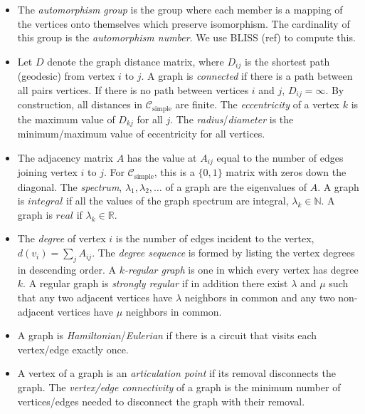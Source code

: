 \documentclass[12pt]{article}
\newcommand{\SIMPLECLASS}{\mathcal{C}_\text{simple}}
\begin{document}
\begin{itemize}

\item The \textit{automorphism group} is the group where each member is a mapping of the vertices onto themselves which preserve isomorphism. 
The cardinality of this group is the \textit{automorphism number}.
We use BLISS (ref) to compute this.

\item Let $D$ denote the graph distance matrix, where $D_{ij}$ is the shortest path (geodesic) from vertex $i$ to $j$.
A graph is \textit{connected} if there is a path between all pairs vertices.
If there is no path between vertices $i$ and $j$, $D_{ij}=\infty$.
By construction, all distances in $\SIMPLECLASS$ are finite.
The \textit{eccentricity} of a vertex $k$ is the maximum value of $D_{k j}$ for all $j$.
The \textit{radius}/\textit{diameter} is the minimum/maximum value of eccentricity for all vertices.

\item The adjacency matrix $A$ has the value at $A_{ij}$ equal to the number of edges joining vertex $i$ to $j$. 
For $\SIMPLECLASS$, this is a $\{0,1\}$ matrix with zeros down the diagonal. 
The \textit{spectrum}, $\lambda_1, \lambda_2, \ldots$ of a graph are the eigenvalues of $A$. 
A graph is $integral$ if all the values of the graph spectrum are integral, $\lambda_k \in \mathbb{N}$. 
A graph is $real$ if $\lambda_k \in \mathbb{R}$.

\item The \textit{degree} of vertex $i$ is the number of edges incident to the vertex, $d(v_i) = \sum_j A_{ij}$. 
The \textit{degree sequence} is formed by listing the vertex degrees in descending order.  
A \textit{$k$-regular graph} is one in which every vertex has degree $k$. 
A regular graph is \textit{strongly regular} if in addition there exist $\lambda$ and $\mu$ such that any two adjacent vertices have $\lambda$ neighbors in common and any two non-adjacent vertices have $\mu$ neighbors in common. 

\item A graph is \textit{Hamiltonian}/\textit{Eulerian} if there is a circuit that visits each vertex/edge exactly once.

\item A vertex of a graph is an \textit{articulation point} if its removal disconnects the graph. 
The \textit{vertex/edge connectivity} of a graph is the minimum number of vertices/edges needed to disconnect the graph with their removal. 


\end{itemize}
\end{document}

